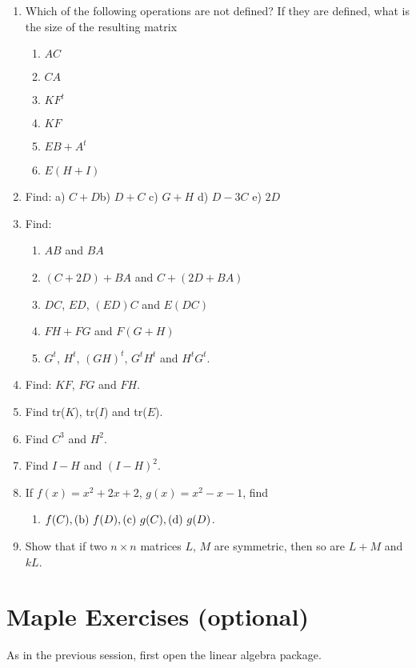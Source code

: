 \begin{enumerate}
\item Which of the following operations are not defined? If they
are defined, what is the size of the resulting matrix
\begin{enumerate}
\item $AC$
\item $CA$
\item $KF^t$
\item $KF$
\item $EB+A^t$
\item $E(H+I)$
\end{enumerate}
\item Find: a) $C+D$\quad b) $D+C$ \quad  c) $G+H$ \quad
d) $D-3C$ \quad e) $2D$
\item Find:
\begin{enumerate} \item $AB$ and $BA$
\item $(C+2D)+BA$ and $C+(2D+BA)$
\item $DC$, $ED$, $(ED)C$ and $E(DC)$
\item $FH+FG$ and $F(G+H)$
\item $G^t$, $H^t$, $(GH)^t$, $G^tH^t$ and $H^tG^t$.
\end{enumerate}
\item Find: $KF$, $FG$ and $FH$.
\item Find tr($K$), tr($I$) and tr($E$).
\item Find $C^3$ and $H^2$.
\item Find $I-H$  and $(I-H)^2$.
\item If $f(x)=x^{2} +2x+2$, $g(x)=x^{2}-x-1$, find
\begin{enumerate} \item $f(C), {\rm (b)}~f(D), {\rm (c)}~g(C), {\rm (d)}~g(D)$.
\end{enumerate}
\item Show that if two $n \times n$ matrices $L$, $M$ are symmetric, then so are $L+M$ and $kL$.

\end{enumerate}



\iffalse
\section{Maple Exercises (optional)}

As in the previous session, first open the linear algebra package.

\begin{maplegroup}
\begin{mapleinput}
\end{mapleinput}

\end{maplegroup}
\bigskip

